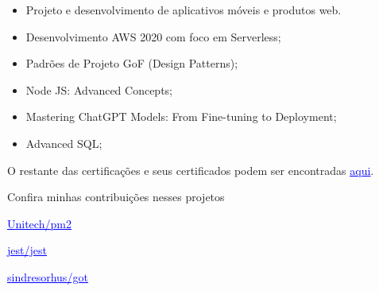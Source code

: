 \documentclass[10pt,a4paper,ragged2e,withhyper]{altacv}
\begin{document}
\begin{paracol}{2}
\divider
{}
\begin{itemize}
  \item Projeto e desenvolvimento de aplicativos móveis e produtos web.
\end{itemize}


\medskip




\divider


\medskip



\begin{itemize}
  \item Desenvolvimento AWS 2020 com foco em Serverless;
  \item Padrões de Projeto GoF (Design Patterns);
  \item Node JS: Advanced Concepts;
  \item Mastering ChatGPT Models: From Fine-tuning to Deployment;
  \item Advanced SQL;
\end{itemize}

O restante das certificações e seus certificados podem ser encontradas \href{https://www.linkedin.com/in/agostini-willian/details/certifications/}{\textcolor{blue}{\underline{aqui}}}.

Confira minhas contribuições nesses projetos 

\href{https://github.com/Unitech/pm2/issues?q=commenter%3AWillianAgostini+}{\textcolor{blue}{\underline{Unitech/pm2}}}

\href{https://github.com/jestjs/jest/issues?q=commenter%3AWillianAgostini+}{\textcolor{blue}{\underline{jest/jest}}}

\href{https://github.com/sindresorhus/got/issues?q=commenter%3AWillianAgostini+}{\textcolor{blue}{\underline{sindresorhus/got}}}


\end{paracol}
\end{document}
